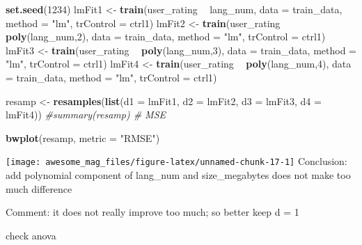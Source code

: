 \documentclass[]{article}
\newenvironment{Shaded}{\begin{snugshade}}{\end{snugshade}}
\newcommand{\KeywordTok}[1]{\textcolor[rgb]{0.13,0.29,0.53}{\textbf{#1}}}
\newcommand{\DataTypeTok}[1]{\textcolor[rgb]{0.13,0.29,0.53}{#1}}
\newcommand{\DecValTok}[1]{\textcolor[rgb]{0.00,0.00,0.81}{#1}}
\newcommand{\StringTok}[1]{\textcolor[rgb]{0.31,0.60,0.02}{#1}}
\newcommand{\CommentTok}[1]{\textcolor[rgb]{0.56,0.35,0.01}{\textit{#1}}}
\newcommand{\OperatorTok}[1]{\textcolor[rgb]{0.81,0.36,0.00}{\textbf{#1}}}
\newcommand{\NormalTok}[1]{#1}
\begin{document}
\begin{Shaded}
\begin{Highlighting}[]
\KeywordTok{set.seed}\NormalTok{(}\DecValTok{1234}\NormalTok{)}
\NormalTok{lmFit1 <-}\StringTok{ }\KeywordTok{train}\NormalTok{(user_rating }\OperatorTok{~}\StringTok{ }\NormalTok{lang_num,}
                \DataTypeTok{data =}\NormalTok{ train_data, }
                \DataTypeTok{method =} \StringTok{"lm"}\NormalTok{,}
                \DataTypeTok{trControl =}\NormalTok{ ctrl1) }
\NormalTok{lmFit2 <-}\StringTok{ }\KeywordTok{train}\NormalTok{(user_rating }\OperatorTok{~}\StringTok{ }\KeywordTok{poly}\NormalTok{(lang_num,}\DecValTok{2}\NormalTok{),}
                \DataTypeTok{data =}\NormalTok{ train_data, }
                \DataTypeTok{method =} \StringTok{"lm"}\NormalTok{,}
                \DataTypeTok{trControl =}\NormalTok{ ctrl1)}
\NormalTok{lmFit3 <-}\StringTok{ }\KeywordTok{train}\NormalTok{(user_rating }\OperatorTok{~}\StringTok{ }\KeywordTok{poly}\NormalTok{(lang_num,}\DecValTok{3}\NormalTok{),}
                \DataTypeTok{data =}\NormalTok{ train_data, }
                \DataTypeTok{method =} \StringTok{"lm"}\NormalTok{,}
                \DataTypeTok{trControl =}\NormalTok{ ctrl1)}
\NormalTok{lmFit4 <-}\StringTok{ }\KeywordTok{train}\NormalTok{(user_rating }\OperatorTok{~}\StringTok{ }\KeywordTok{poly}\NormalTok{(lang_num,}\DecValTok{4}\NormalTok{),}
                \DataTypeTok{data =}\NormalTok{ train_data, }
                \DataTypeTok{method =} \StringTok{"lm"}\NormalTok{,}
                \DataTypeTok{trControl =}\NormalTok{ ctrl1)}

\NormalTok{resamp <-}\StringTok{ }\KeywordTok{resamples}\NormalTok{(}\KeywordTok{list}\NormalTok{(}\DataTypeTok{d1 =}\NormalTok{ lmFit1, }\DataTypeTok{d2 =}\NormalTok{ lmFit2, }\DataTypeTok{d3 =}\NormalTok{ lmFit3, }\DataTypeTok{d4 =}\NormalTok{ lmFit4)) }
\CommentTok{#summary(resamp) # MSE}

\KeywordTok{bwplot}\NormalTok{(resamp, }\DataTypeTok{metric =} \StringTok{"RMSE"}\NormalTok{)}
\end{Highlighting}
\end{Shaded}

\texttt{[image: awesome\_mag\_files/figure-latex/unnamed-chunk-17-1]}
Conclusion: add polynomial component of lang\_num and size\_megabytes
does not make too much difference

Comment: it does not really improve too much; so better keep d = 1

check anova
\end{document}
